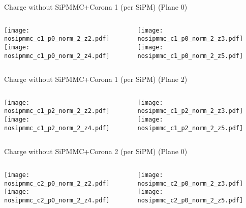 \documentclass{beamer}
\begin{document}
\begin{frame}{Charge without SiPMMC+Corona 1 (per SiPM) (Plane 0)}
	\begin{columns}[onlytextwidth]
		\begin{column}{0.5\textwidth}
			\texttt{[image: nosipmmc\_c1\_p0\_norm\_2\_z2.pdf]} \\
			\texttt{[image: nosipmmc\_c1\_p0\_norm\_2\_z4.pdf]}
		 \end{column}
		 \begin{column}{0.5\textwidth}
			\texttt{[image: nosipmmc\_c1\_p0\_norm\_2\_z3.pdf]} \\
			\texttt{[image: nosipmmc\_c1\_p0\_norm\_2\_z5.pdf]}
		 \end{column}
 \end{columns}
\end{frame}

\begin{frame}{Charge without SiPMMC+Corona 1 (per SiPM) (Plane 2)}
	\begin{columns}[onlytextwidth]
		\begin{column}{0.5\textwidth}
			\texttt{[image: nosipmmc\_c1\_p2\_norm\_2\_z2.pdf]} \\
			\texttt{[image: nosipmmc\_c1\_p2\_norm\_2\_z4.pdf]}
		 \end{column}
		 \begin{column}{0.5\textwidth}
			\texttt{[image: nosipmmc\_c1\_p2\_norm\_2\_z3.pdf]} \\
			\texttt{[image: nosipmmc\_c1\_p2\_norm\_2\_z5.pdf]}
		 \end{column}
 \end{columns}
\end{frame}


\begin{frame}{Charge without SiPMMC+Corona 2 (per SiPM) (Plane 0)}
	\begin{columns}[onlytextwidth]
		\begin{column}{0.5\textwidth}
			\texttt{[image: nosipmmc\_c2\_p0\_norm\_2\_z2.pdf]} \\
			\texttt{[image: nosipmmc\_c2\_p0\_norm\_2\_z4.pdf]}
		 \end{column}
		 \begin{column}{0.5\textwidth}
			\texttt{[image: nosipmmc\_c2\_p0\_norm\_2\_z3.pdf]} \\
			\texttt{[image: nosipmmc\_c2\_p0\_norm\_2\_z5.pdf]}
		 \end{column}
 \end{columns}
\end{frame}
\end{document}
